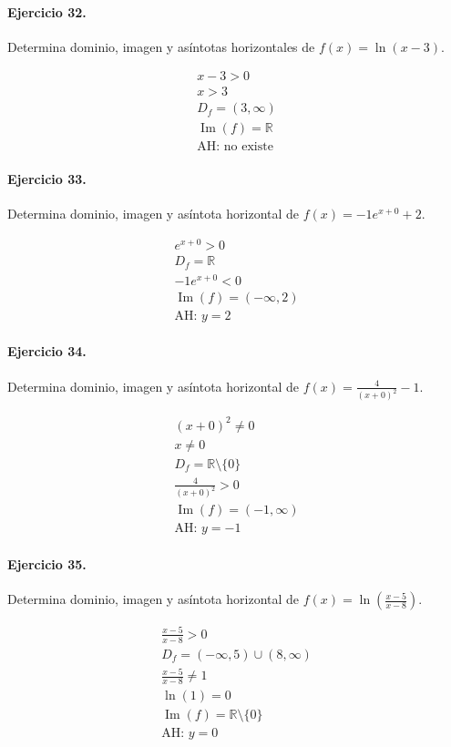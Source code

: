 \documentclass[11pt,a4paper]{article}
\begin{document}
\paragraph{Ejercicio 32.} Determina dominio, imagen y asíntotas horizontales de $f(x)=\ln(x-3)$.

\[
\begin{aligned}
x-3>0\\
x>3\\
D_f=(3,\infty)\\
\operatorname{Im}(f)=\mathbb{R}\\
\text{{AH: no existe}}
\end{aligned}
\]


\paragraph{Ejercicio 33.} Determina dominio, imagen y asíntota horizontal de $f(x)=-1e^{x+0}+2$.

\[
\begin{aligned}
e^{x+0}>0\\
D_f=\mathbb{R}\\
-1e^{x+0}<0\\
\operatorname{Im}(f)=(-\infty,2)\\
\text{AH: }y=2
\end{aligned}
\]


\paragraph{Ejercicio 34.} Determina dominio, imagen y asíntota horizontal de $f(x)=\frac{4}{(x+0)^2}-1$.

\[
\begin{aligned}
(x+0)^2\ne0\\
x\ne 0\\
D_f=\mathbb{R}\setminus\{0\}\\
\frac{4}{(x+0)^2}>0\\
\operatorname{Im}(f)=(-1,\infty)\\
\text{AH: }y=-1
\end{aligned}
\]


\paragraph{Ejercicio 35.} Determina dominio, imagen y asíntota horizontal de $f(x)=\ln\left(\frac{x-5}{x-8}\right)$.

\[
\begin{aligned}
\frac{x-5}{x-8} >0\\
D_f=(-\infty,5)\cup(8,\infty)\\
\frac{x-5}{x-8}\ne1\\
\ln(1)=0\\
\operatorname{Im}(f)=\mathbb{R}\setminus\{0\}\\
\text{{AH: }}y=0
\end{aligned}
\]
\end{document}
